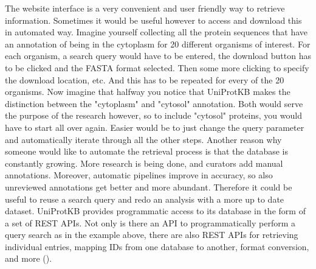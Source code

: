 The website interface is a very convenient and user friendly way to retrieve information.
Sometimes it would be useful however to access and download this in automated way.
Imagine yourself collecting all the protein sequences that have an annotation of being in the cytoplasm for 20 different organisms of interest.
For each organism, a search query would have to be entered,
the download button has to be clicked and the FASTA format selected.
Then some more clicking to specify the download location, etc.
And this has to be repeated for every of the 20 organisms. 
Now imagine that halfway you notice that UniProtKB makes the distinction 
between the "cytoplasm" and "cytosol" annotation.
Both would serve the purpose of the research however, 
so to include "cytosol" proteins, you would have to start all over again.
Easier would be to just change the query parameter and automatically iterate through all the other steps.
Another reason why someone would like to automate the retrieval process is that the database is constantly growing.
More research is being done, and curators add manual annotations.
Moreover, automatic pipelines improve in accuracy, so also unreviewed annotations get better and more abundant.
Therefore it could be useful to reuse a search query and redo an analysis with a more up to date dataset.
UniProtKB provides programmatic access to its database in the form of a set of REST APIs.
Not only is there an API to programmatically perform a query search as in the example above,
there are also REST APIs for 
retrieving individual entries,
mapping IDs from one database to another,
format conversion, 
and more
(\cite{uniprot_api}).
